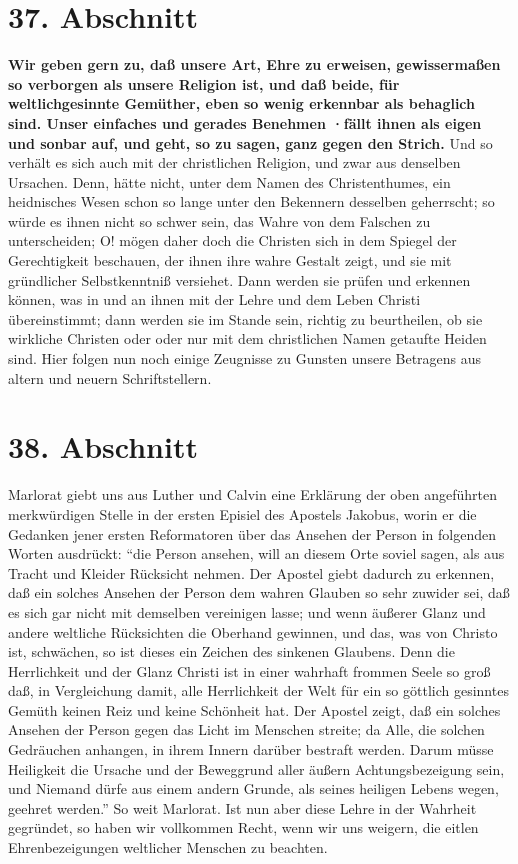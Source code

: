 \section{37. Abschnitt} \label{kap9_ab37}

\textbf{Wir geben gern zu, daß unsere Art, Ehre zu erweisen, gewissermaßen so verborgen
als unsere Religion ist, und daß beide, für weltlichgesinnte Gemüther, eben so
wenig erkennbar als behaglich sind. Unser einfaches und gerades Benehmen ·fällt
ihnen als eigen und sonbar auf, und geht, so zu sagen, ganz gegen den Strich.} 
Und so verhält es sich auch mit der christlichen Religion, und zwar aus
denselben Ursachen. Denn, hätte nicht, unter dem Namen des Christenthumes, ein
heidnisches Wesen schon so lange unter den Bekennern desselben geherrscht; so
würde es ihnen nicht so schwer sein, das Wahre von dem Falschen zu
unterscheiden; O! mögen daher doch die Christen sich in dem Spiegel der
Gerechtigkeit beschauen, der ihnen ihre wahre Gestalt zeigt, und sie mit
gründlicher Selbstkenntniß versiehet. Dann werden sie prüfen und erkennen
können, was in und an ihnen mit der Lehre und dem Leben Christi übereinstimmt;
dann werden sie im Stande sein, richtig zu beurtheilen, ob sie wirkliche
Christen oder oder nur mit dem christlichen Namen getaufte Heiden sind. Hier
folgen nun noch einige Zeugnisse zu Gunsten unsere Betragens aus altern und
neuern Schriftstellern.

\section{38. Abschnitt} \label{kap9_ab38}

Marlorat giebt uns aus Luther und Calvin eine Erklärung der oben angeführten
merkwürdigen Stelle in der ersten Episiel des Apostels Jakobus, worin er die
Gedanken jener ersten Reformatoren über das Ansehen der Person in folgenden
Worten ausdrückt: "`die Person ansehen, will an diesem Orte soviel sagen, als
aus Tracht und Kleider Rücksicht nehmen. Der Apostel giebt dadurch zu erkennen,
daß ein solches Ansehen der Person dem wahren Glauben so sehr zuwider sei, daß
es sich gar nicht mit demselben vereinigen lasse; und wenn äußerer Glanz und
andere weltliche Rücksichten die Oberhand gewinnen, und das, was von Christo
ist, schwächen, so ist dieses ein Zeichen des sinkenen Glaubens. Denn die
Herrlichkeit und der Glanz Christi ist in einer wahrhaft frommen Seele so groß
daß, in Vergleichung damit, alle Herrlichkeit der Welt für ein so göttlich
gesinntes Gemüth keinen Reiz und keine Schönheit hat. Der Apostel zeigt, daß ein
solches Ansehen der Person gegen das Licht im Menschen streite; da Alle, die
solchen Gedräuchen anhangen, in ihrem Innern darüber bestraft werden. Darum
müsse Heiligkeit die Ursache und der Beweggrund aller äußern Achtungsbezeigung
sein, und Niemand dürfe aus einem andern Grunde, als seines heiligen Lebens
wegen, geehret werden."' So weit Marlorat. Ist nun aber diese Lehre in der
Wahrheit gegründet, so haben wir vollkommen Recht, wenn wir uns weigern, die
eitlen Ehrenbezeigungen weltlicher Menschen zu beachten.


